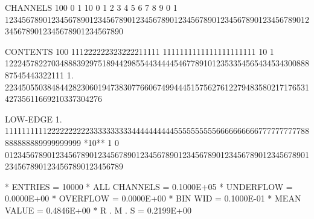 \begin{minipage}[t]{.495\textwidth}
\begin{XMPfrac}{3.2}
CHANNELS 100   0                                                                                                  1
          10   0        1         2         3         4         5         6         7         8         9         0
           1   1234567890123456789012345678901234567890123456789012345678901234567890123456789012345678901234567890
 
CONTENTS 100                       111222222323222211111                  1111111111111111111111
          10             1 12224578227034888392975189442985544344445467789101235335456543453430088887545443322111
           1.       22345055038484428230601947383077660674994445157562761227948358021717653142735611669210337304276
 
LOW-EDGE   1.            111111111122222222223333333333444444444455555555556666666666777777777788888888889999999999
*10**  1   0   0123456789012345678901234567890123456789012345678901234567890123456789012345678901234567890123456789
 
* ENTRIES =      10000      * ALL CHANNELS = 0.1000E+05      * UNDERFLOW = 0.0000E+00      * OVERFLOW = 0.0000E+00
* BIN WID = 0.1000E-01      * MEAN VALUE   = 0.4846E+00      * R . M . S = 0.2199E+00
\end{XMPfrac} 
\end{minipage}\hfill
